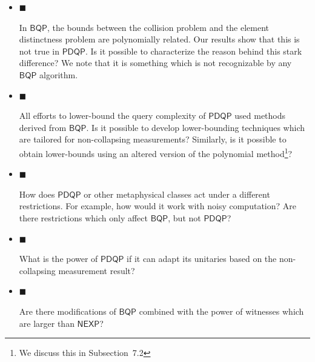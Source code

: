 \documentclass[10pt,a4paper]{article}
\begin{document}
\begin{itemize}


\item[] 
$\blacksquare$ 


In $\mathsf{BQP}$, the bounds between the collision problem and the element distinctness problem are polynomially related. Our results show that this is not true in $\mathsf{PDQP}$. Is it possible to characterize the reason behind this stark difference? We note that it is something which is not recognizable by any $\mathsf{BQP}$ algorithm.\par





\item[] 
$\blacksquare$ 


All efforts to lower-bound the query complexity of $\mathsf{PDQP}$ used methods derived from $\mathsf{BQP}$. Is it possible to develop lower-bounding techniques which are tailored for non-collapsing measurements? Similarly, is it possible to obtain lower-bounds using an altered version of the polynomial method\footnote{We discuss this in Subsection 7.2}?\par





\item[] 
$\blacksquare$ 


How does $\mathsf{PDQP}$ or other metaphysical classes act under a different restrictions. For example, how would it work with noisy computation? Are there restrictions which only affect $\mathsf{BQP}$, but not $\mathsf{PDQP}$?\par





\item[] 
$\blacksquare$ 


What is the power of $\mathsf{PDQP}$ if it can adapt its unitaries based on the non-collapsing measurement result?\par





\item[] 
$\blacksquare$ 


Are there modifications of $\mathsf{BQP}$ combined with the power of witnesses which are larger than $\mathsf{NEXP}$?\par






\end{itemize}
\end{document}
